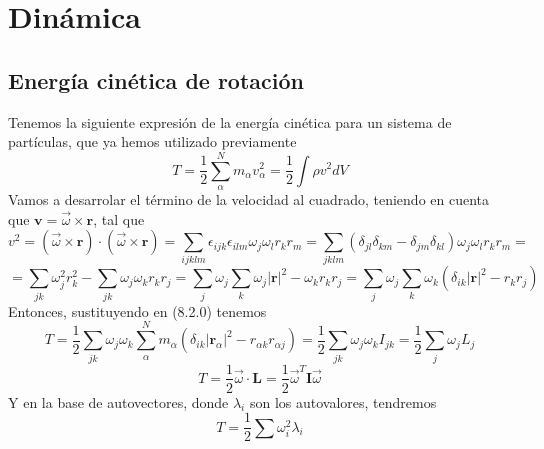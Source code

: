 \section{Dinámica}
\subsection{Energía cinética de rotación}
Tenemos la siguiente expresión de la energía cinética para un sistema de partículas, que ya hemos utilizado previamente
\begin{equation} \label{6.1.1}
    T = \frac{1}{2} \sum_\alpha^N m_\alpha v_\alpha^2 = \frac{1}{2}\int \rho v^2 dV
\end{equation} 
Vamos a desarrolar el término de la velocidad al cuadrado, teniendo en cuenta que $\mathbf{v} = \vec{\omega} \times \mathbf{r}$, tal que
\[v^2 =  (\vec{\omega} \times \mathbf{r}) \cdot (\vec{\omega} \times \mathbf{r}) = \sum_{ijklm} \epsilon_{ijk} \epsilon_{ilm} \omega_j \omega_l r_k r_m = \sum_{jklm} (\delta_{jl} \delta_{km}- \delta_{jm} \delta_{kl}) \omega_j \omega_l r_k r_m =\]
\vspace{-10pt}
\begin{equation} \label{6.1.1}
    = \sum_{jk} \omega_j^2 r_k^2 - \sum_{jk}\omega_j \omega_k r_k r_j = \sum_{j} \omega_j \sum_{k} \omega_j |\mathbf{r}|^2 - \omega_k r_k r_j = \sum_{j} \omega_j \sum_{k} \omega_k \left(\delta_{ik}|\mathbf{r}|^2  - r_k r_j\right)
\end{equation} 
Entonces, sustituyendo en (8.2.0) tenemos
\begin{equation} \label{6.1.1}
    T = \frac{1}{2} \sum_{jk} \omega_j \omega_k \sum_\alpha^N m_\alpha\left(\delta_{ik}|\mathbf{r}_\alpha|^2 - r_{\alpha k} r_{\alpha j}\right) = \frac{1}{2} \sum_{jk} \omega_j \omega_k I_{jk} = \frac{1}{2} \sum_{j} \omega_j L_j
\end{equation} 
\begin{equation} \label{6.1.1}
    T = \frac{1}{2} \vec{\omega} \cdot \mathbf{L} = \frac{1}{2} \vec{\omega}^T \mathbf{I} \vec{\omega}
\end{equation} 
Y en la base de autovectores, donde $\lambda_i$ son los autovalores, tendremos
\begin{equation} \label{6.1.1}
    T = \frac{1}{2} \sum \omega_i^2 \lambda_i \end{equation}
\newpage
